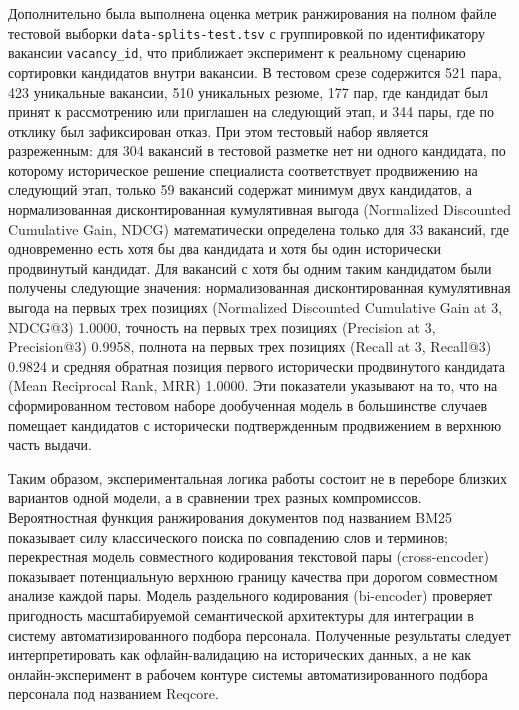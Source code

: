 Дополнительно была выполнена оценка метрик ранжирования на полном файле тестовой выборки \texttt{data-splits-test.tsv} с группировкой по идентификатору вакансии \texttt{vacancy\_id}, что приближает эксперимент к реальному сценарию сортировки кандидатов внутри вакансии. В тестовом срезе содержится 521 пара, 423 уникальные вакансии, 510 уникальных резюме, 177 пар, где кандидат был принят к рассмотрению или приглашен на следующий этап, и 344 пары, где по отклику был зафиксирован отказ. При этом тестовый набор является разреженным: для 304 вакансий в тестовой разметке нет ни одного кандидата, по которому историческое решение специалиста соответствует продвижению на следующий этап, только 59 вакансий содержат минимум двух кандидатов, а нормализованная дисконтированная кумулятивная выгода (Normalized Discounted Cumulative Gain, NDCG) математически определена только для 33 вакансий, где одновременно есть хотя бы два кандидата и хотя бы один исторически продвинутый кандидат. Для вакансий с хотя бы одним таким кандидатом были получены следующие значения: нормализованная дисконтированная кумулятивная выгода на первых трех позициях (Normalized Discounted Cumulative Gain at 3, NDCG@3) 1.0000, точность на первых трех позициях (Precision at 3, Precision@3) 0.9958, полнота на первых трех позициях (Recall at 3, Recall@3) 0.9824 и средняя обратная позиция первого исторически продвинутого кандидата (Mean Reciprocal Rank, MRR) 1.0000. Эти показатели указывают на то, что на сформированном тестовом наборе дообученная модель в большинстве случаев помещает кандидатов с исторически подтвержденным продвижением в верхнюю часть выдачи.

Таким образом, экспериментальная логика работы состоит не в переборе близких вариантов одной модели, а в сравнении трех разных компромиссов. Вероятностная функция ранжирования документов под названием BM25 показывает силу классического поиска по совпадению слов и терминов; перекрестная модель совместного кодирования текстовой пары (cross-encoder) показывает потенциальную верхнюю границу качества при дорогом совместном анализе каждой пары. Модель раздельного кодирования (bi-encoder) проверяет пригодность масштабируемой семантической архитектуры для интеграции в систему автоматизированного подбора персонала. Полученные результаты следует интерпретировать как офлайн-валидацию на исторических данных, а не как онлайн-эксперимент в рабочем контуре системы автоматизированного подбора персонала под названием Reqcore.

